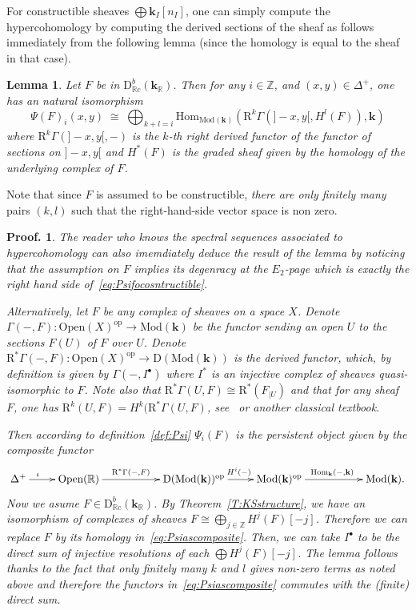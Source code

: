 \documentclass[a4paper, english, 11pt]{article}
\newcommand{\kk}[0]{\textbf{k}}
\newcommand{\Mod}[0]{\text{Mod}}
\newcommand{\0}{\vec{0}}
\newcommand{\R}[0]{\mathbb{R}}
\newcommand{\Z}[0]{\mathbb{Z}}
\newcommand{\D}[0]{\text{D}}
\newcommand{\Ouv}[0]{\mathrm{Open}}
\newcommand{\op}[0]{\text{op}}
\newcommand{\Hom}[0]{\text{Hom}}
\newcommand{\Rr}[0]{\text{R}}
\newtheorem*{pf}{Proof.} }
\newtheorem{lem}[prop]{Lemma}
\begin{document}
  \smallskip 
  
For constructible sheaves $\bigoplus \kk_{I}[n_I]$, one can simply compute the hypercohomology by  computing the derived sections of the sheaf as follows immediately from the following lemma (since the homology is equal to the sheaf in that case).  
\begin{lem}\label{L:DefadnFunctorialityPsi}
 Let $F$ be in $\D^b_{\R c}(\kk_\R)$. Then for any $i\in \Z$, and $(x,y)\in \Delta^+$, one has an natural isomorphism
 \begin{equation}\label{eq:Psifocosntructible}\Psi(F)_i(x,y)\; \cong\; \bigoplus_{k+l = i} \Hom_{\Mod(\kk)}\left ( \Rr^k\Gamma \left ( ]-x,y[ ,  H^l(F)\right ), \kk \right )  \end{equation}
 where $\Rr^k\Gamma \left ( ]-x,y[ , -\right )$ is the $k$-th right derived functor of the functor of sections on $]-x,y[$ and $H^*(F)$ is the graded sheaf given by the homology of the underlying complex of $F$. 
\end{lem}
Note that since $F$ is assumed to be constructible, \emph{there are only finitely many} pairs $(k,l)$ such that the right-hand-side vector space is non zero.


  \begin{pf}
  The reader who knows the spectral sequences associated to hypercohomology can also imemdiately deduce the result of the lemma by noticing that the assumption on $F$ implies its degenracy at the $E_2$-page which is exactly the right hand side of~\eqref{eq:Psifocosntructible}.
   
   \smallskip
   
   Alternatively, let $F$ be any complex of sheaves on a space $X$. Denote $\Gamma(-,F): \Ouv(X)^{\op}\to \Mod(\kk)$ be the functor sending an open $U$ to the sections $F(U)$ of $F$ over $U$. Denote 
   $\Rr^*\Gamma(-,F): \Ouv(X)^{\op}\to \D(\Mod(\kk))$ is the derived functor, which, by definition is given by $\Gamma(-, I^\bullet)$ where $I^*$ is an injective complex of sheaves quasi-isomorphic to $F$.  Note also that 
   $\Rr^* \Gamma(U, F) \cong \Rr^*(F_{|U})$ and that for any sheaf $F$, one has $\Rr^k(U,F)= H^k(\Rr^*\Gamma(U,F)$, see~\cite{Kash90} or another classical textbook.
   
   Then according to definition~\ref{def:Psi} $\Psi_i(F)$ is the persistent object given by the composite functor
  \begin{equation}\label{eq:Psiascomposite}\xymatrix{\Delta^+ \ar[r]^{\iota\qquad} &\Ouv(\R) \ar[rr]^{\Rr^*\Gamma(-,F)\quad } && \D(\Mod(\kk))^{\op} \ar[r]^{\;\;H^i(-)} & \Mod(\kk)^{\op} \ar[rr]^{\Hom_{\kk}( - , \kk)} && \Mod(\kk).}\end{equation}
  Now we asume $F \in \D^b_{\R c}(\kk_\R)$. By Theorem~\ref{T:KSstructure}, we have an isomorphism of complexes of sheaves 
  $F \cong \bigoplus_{j\in \Z} H^j(F)[-j]$. Therefore we can replace $F$ by its homology in~\eqref{eq:Psiascomposite}. Then,  we can take $I^\bullet$ to be the direct sum of injective resolutions of each $\bigoplus H^j(F)[-j]$. The lemma follows  thanks to the fact that only finitely many $k$ and $l$ gives non-zero terms as noted above and therefore the functors in~\eqref{eq:Psiascomposite} commutes with the (finite) direct sum.
  \end{pf}
\end{document}
